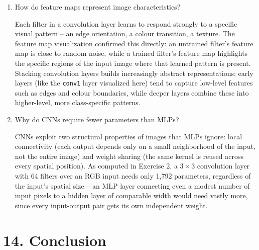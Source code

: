 \documentclass[11pt]{article}
\begin{document}
\begin{enumerate}
Pooling reduces the spatial dimensions of feature maps (the max pooling vs. average pooling comparison showed both pooling types roughly halved each spatial dimension), which reduces the number of parameters and computation needed in subsequent layers and provides a degree of translation invariance -- small shifts in where a feature appears in the input have less effect on the pooled output. It also acts as a mild form of regularization by discarding precise spatial information that isn't necessary for classification.

\item How do feature maps represent image characteristics?

Each filter in a convolution layer learns to respond strongly to a specific visual pattern -- an edge orientation, a colour transition, a texture. The feature map visualization confirmed this directly: an untrained filter's feature map is close to random noise, while a trained filter's feature map highlights the specific regions of the input image where that learned pattern is present. Stacking convolution layers builds increasingly abstract representations: early layers (like the \texttt{conv1} layer visualized here) tend to capture low-level features such as edges and colour boundaries, while deeper layers combine these into higher-level, more class-specific patterns.

\item Why do CNNs require fewer parameters than MLPs?

CNNs exploit two structural properties of images that MLPs ignore: local connectivity (each output depends only on a small neighborhood of the input, not the entire image) and weight sharing (the same kernel is reused across every spatial position). As computed in Exercise 2, a $3\times3$ convolution layer with 64 filters over an RGB input needs only 1,792 parameters, regardless of the input's spatial size -- an MLP layer connecting even a modest number of input pixels to a hidden layer of comparable width would need vastly more, since every input-output pair gets its own independent weight.

\end{enumerate}

\section*{14. Conclusion}
\end{document}
